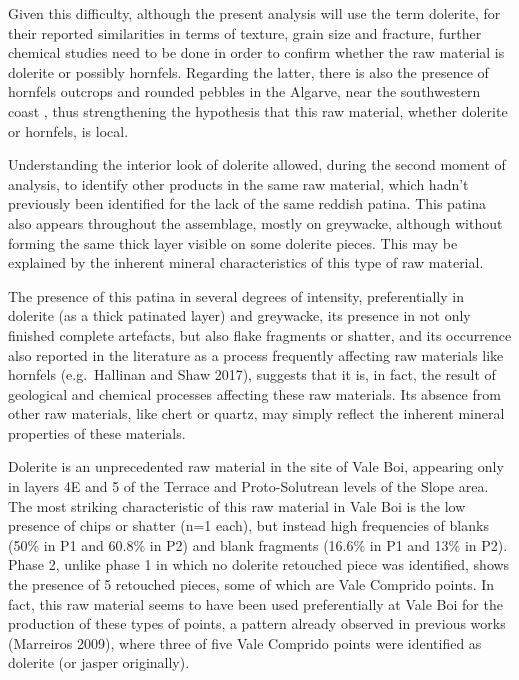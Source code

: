 \documentclass[12pt,twoside]{reedthesis}
\begin{document}
Given this difficulty, although the present analysis will use the term dolerite, for their reported similarities in terms of texture, grain size and fracture, further chemical studies need to be done in order to confirm whether the raw material is dolerite or possibly hornfels. Regarding the latter, there is also the presence of hornfels outcrops and rounded pebbles in the Algarve, near the southwestern coast , thus strengthening the hypothesis that this raw material, whether dolerite or hornfels, is local.

Understanding the interior look of dolerite allowed, during the second moment of analysis, to identify other products in the same raw material, which hadn't previously been identified for the lack of the same reddish patina. This patina also appears throughout the assemblage, mostly on greywacke, although without forming the same thick layer visible on some dolerite pieces. This may be explained by the inherent mineral characteristics of this type of raw material.

The presence of this patina in several degrees of intensity, preferentially in dolerite (as a thick patinated layer) and greywacke, its presence in not only finished complete artefacts, but also flake fragments or shatter, and its occurrence also reported in the literature as a process frequently affecting raw materials like hornfels (e.g.~Hallinan and Shaw 2017), suggests that it is, in fact, the result of geological and chemical processes affecting these raw materials. Its absence from other raw materials, like chert or quartz, may simply reflect the inherent mineral properties of these materials.

Dolerite is an unprecedented raw material in the site of Vale Boi, appearing only in layers 4E and 5 of the Terrace and Proto-Solutrean levels of the Slope area. The most striking characteristic of this raw material in Vale Boi is the low presence of chips or shatter (n=1 each), but instead high frequencies of blanks (50\% in P1 and 60.8\% in P2) and blank fragments (16.6\% in P1 and 13\% in P2). Phase 2, unlike phase 1 in which no dolerite retouched piece was identified, shows the presence of 5 retouched pieces, some of which are Vale Comprido points. In fact, this raw material seems to have been used preferentially at Vale Boi for the production of these types of points, a pattern already observed in previous works (Marreiros 2009), where three of five Vale Comprido points were identified as dolerite (or jasper originally).
\end{document}
